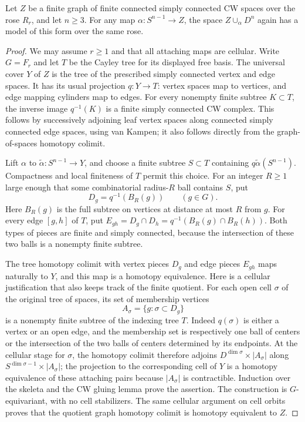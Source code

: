 \begin{lemma}
\label{D:tree-enlargement}
Let $Z$ be a finite graph of finite connected simply connected CW spaces
over the rose $R_r$, and let $n\geq3$. For any map
$\alpha:S^{n-1}\to Z$, the space $Z\cup_\alpha D^n$ again has a model of
this form over the same rose.
\end{lemma}
\begin{proof}
We may assume $r\geq1$ and that all attaching maps are cellular. Write
$G=F_r$ and let $T$ be the Cayley tree for its displayed free basis.
The universal cover $Y$ of $Z$ is the tree of the prescribed simply
connected vertex and edge spaces. It has its usual projection $q:Y\to T$:
vertex spaces map to vertices, and edge mapping cylinders map to edges.
For every nonempty finite subtree $K\subset T$, the inverse image
$q^{-1}(K)$ is a finite simply connected CW complex. This follows by
successively adjoining leaf vertex spaces along connected simply
connected edge spaces, using van Kampen; it also follows directly from
the graph-of-spaces homotopy colimit.

Lift $\alpha$ to $\widetilde\alpha:S^{n-1}\to Y$, and choose a finite
subtree $S\subset T$ containing $q\widetilde\alpha(S^{n-1})$. Compactness
and local finiteness of $T$ permit this choice. For an integer $R\geq1$
large enough that some combinatorial radius-$R$ ball contains $S$, put
\[
 D_g=q^{-1}(B_R(g)) \qquad(g\in G).
\]
Here $B_R(g)$ is the full subtree on vertices at distance at most $R$
from $g$. For every edge $[g,h]$ of $T$, put
$E_{gh}=D_g\cap D_h=q^{-1}(B_R(g)\cap B_R(h))$.
Both types of pieces are finite and simply connected, because the
intersection of these two balls is a nonempty finite subtree.

The tree homotopy colimit with vertex pieces $D_g$ and edge pieces
$E_{gh}$ maps naturally to $Y$, and this map is a homotopy equivalence.
Here is a cellular justification that also keeps track of the finite
quotient. For each open cell $\sigma$ of the original tree of spaces,
its set of membership vertices
\[
 A_\sigma=\{g:\sigma\subset D_g\}
\]
is a nonempty finite subtree of the indexing tree $T$. Indeed $q(\sigma)$
is either a vertex or an open edge, and the membership set is respectively
one ball of centers or the intersection of the two balls of centers
determined by its endpoints. At the cellular stage for $\sigma$, the
homotopy colimit therefore adjoins
$D^{\dim\sigma}\times |A_\sigma|$ along
$S^{\dim\sigma-1}\times |A_\sigma|$; the projection to the corresponding
cell of $Y$ is a homotopy equivalence of these attaching pairs because
$|A_\sigma|$ is contractible. Induction over the skeleta and the CW gluing
lemma prove the assertion. The construction is $G$-equivariant, with no
cell stabilizers. The same cellular argument on cell orbits proves that
the quotient graph homotopy colimit is homotopy equivalent to $Z$.


\end{proof}
